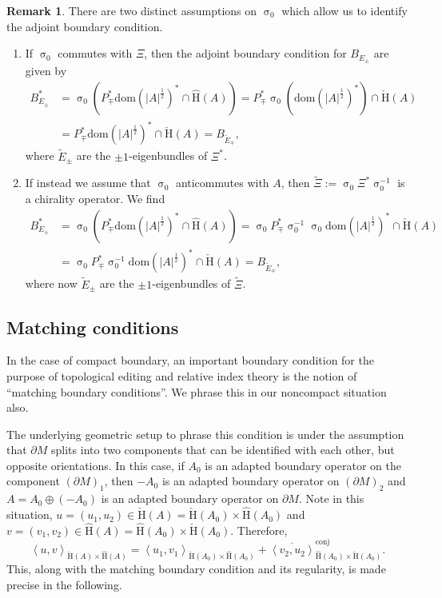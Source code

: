 \documentclass[a4paper,10pt,reqno]{amsart}
\newcommand{\sym}{\upsigma}
\newcommand{\modulus}[1]{|#1|}
\newcommand{\checkH}{\check{\mathrm{H}}}
\newcommand{\hatH}{\hat{\mathrm{H}}}
\newcommand{\dom}{\mathrm{dom}}
\newcommand{\inprod}[1]{\left\langle #1 \right\rangle}%
\newcommand{\dM}{\partial M}
\theoremstyle{definition}
\newtheorem{remark}[theorem]{Remark}
\begin{document}
\begin{remark}\label{rem:ChiralAdjoint}
There are two distinct assumptions on  $\sym_0$ which allow us to identify the adjoint boundary condition.
\begin{enumerate}[label=(\arabic*), labelwidth=0pt, labelindent=2pt, leftmargin=26pt]
\item \label{rem:ChiralAdjoint.1}
If $\sym_0$ commutes with $\Xi$, then the adjoint boundary condition for $B_{E_\pm}$ are given by
\begin{align*}
B_{E_\pm}^*
&=
\sym_0(P_{\mp}^\ast  \dom(\modulus{A}^{\frac12})^\ast \cap \hatH(A))
=
P_{\mp}^\ast  \sym_0(\dom(\modulus{A}^{\frac12})^\ast) \cap \checkH(A)\\
&=
P_{\mp}^\ast  \dom(\modulus{A}^{\frac12})^\ast \cap \checkH(A)
=
B_{\tilde{E}_\mp},
\end{align*}
where $\tilde{E}_\pm$ are the $\pm 1$-eigenbundles of $\Xi^*$.
\item\label{rem:ChiralAdjoint.2}
If instead we assume that $\sym_0$ anticommutes with $A$, then $\tilde{\Xi} := \sym_0\Xi^*\sym_0^{-1}$ is a chirality operator.
We find
\begin{align*}
B_{E_\pm}^*
&=
\sym_0(P_{\mp}^\ast  \dom(\modulus{A}^{\frac12})^\ast \cap \hatH(A))
=
\sym_0P_{\mp}^\ast\sym_0^{-1}  \sym_0\dom(\modulus{A}^{\frac12})^\ast \cap \checkH(A)\\
&=
\sym_0P_{\mp}^\ast\sym_0^{-1}  \dom(\modulus{A}^{\frac12})^\ast \cap \checkH(A)
=
B_{\tilde{E}_\mp}, 
\end{align*}
where now $\tilde{E}_\pm$ are the $\pm 1$-eigenbundles of $\tilde{\Xi}$.
\end{enumerate}


\end{remark}


\subsection{Matching conditions}

In the case of compact boundary, an important boundary condition for the purpose of topological editing and relative index theory is the notion of ``matching boundary conditions''.
We phrase this in our noncompact situation also.

The underlying geometric setup to phrase this condition is under the assumption that $\dM$ splits into two components that can be identified with each other, but opposite orientations.
In this case, if $A_0$ is an adapted  boundary operator  on the component $(\dM)_1$, then $-A_0$ is an adapted boundary operator on $(\dM)_2$ and $A = A_0 \oplus (-A_0)$ is an adapted boundary operator on $\dM$.
Note in this situation, $u = (u_1, u_2) \in \checkH(A) = \checkH(A_0) \times \hatH(A_0)$ and $v = (v_1, v_2) \in \hatH(A) = \hatH(A_0) \times \checkH(A_0)$. 
Therefore,
\begin{equation}
\label{Eq:H2IP}
\inprod{u,v}_{\checkH(A) \times \hatH(A)} = \inprod{u_1, v_1}_{\checkH(A_0) \times \hatH(A_0)} + \overline{\inprod{v_2, u_2}}^{\mathrm{conj}}_{\hatH(A_0) \times \checkH(A_0)}.
\end{equation}
This, along with the matching boundary condition and its regularity, is made precise in the following.
\end{document}
